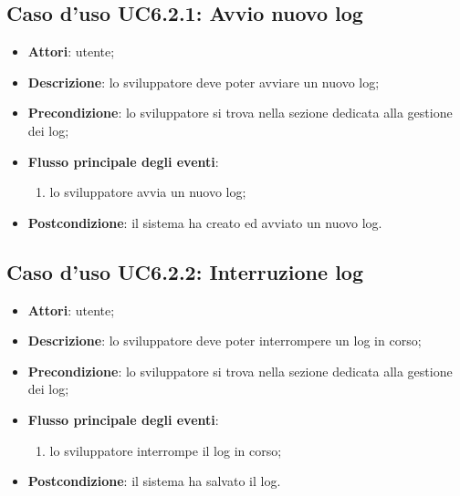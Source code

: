 \documentclass[../AnalisiDeiRequisiti.tex]{subfiles}
\begin{document}
\subsection{Caso d'uso UC6.2.1: Avvio nuovo log}

\begin{itemize}
\item \textbf{Attori}: utente;
\item \textbf{Descrizione}: lo sviluppatore deve poter avviare un nuovo log; 
      \item \textbf{Precondizione}: lo sviluppatore si trova nella sezione dedicata alla gestione dei log;

        \item \textbf{Flusso principale degli eventi}:
          \begin{enumerate}
          \item lo sviluppatore avvia un nuovo log;

      \end{enumerate}
    \item \textbf{Postcondizione}: il sistema ha creato ed avviato un nuovo log.
  \end{itemize}
\hypertarget{UC6.2.2}{}
\subsection{Caso d'uso UC6.2.2: Interruzione log}
\begin{itemize}
\item \textbf{Attori}: utente;
\item \textbf{Descrizione}: lo sviluppatore deve poter interrompere un log in corso; 
      \item \textbf{Precondizione}: lo sviluppatore si trova nella sezione dedicata alla gestione dei log;

        \item \textbf{Flusso principale degli eventi}:
          \begin{enumerate}
          \item lo sviluppatore interrompe il log in corso;

      \end{enumerate}
    \item \textbf{Postcondizione}: il sistema ha salvato il log.
  \end{itemize}
\hypertarget{UC6.2.3}{}
\end{document}
